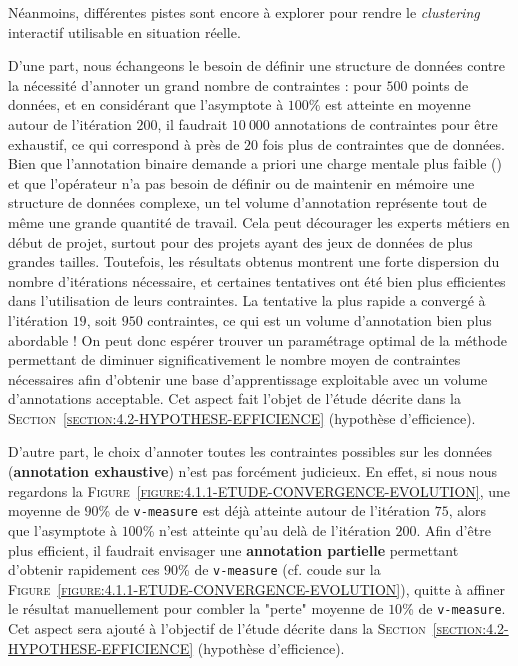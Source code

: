 			
			Néanmoins, différentes pistes sont encore à explorer pour rendre le \textit{clustering} interactif utilisable en situation réelle.
			
			D'une part, nous échangeons le besoin de définir une structure de données contre la nécessité d'annoter un grand nombre de contraintes : pour $500$ points de données, et en considérant que l'asymptote à $100$\% est atteinte en moyenne autour de l'itération $200$, il faudrait $10~000$ annotations de contraintes pour être exhaustif, ce qui correspond à près de $20$ fois plus de contraintes que de données.
			Bien que l'annotation binaire demande a priori une charge mentale plus faible (\cite{hart-staveland:1988:development-nasatlx-task}) et que l'opérateur n'a pas besoin de définir ou de maintenir en mémoire une structure de données complexe, un tel volume d'annotation représente tout de même une grande quantité de travail.
			Cela peut décourager les experts métiers en début de projet, surtout pour des projets ayant des jeux de données de plus grandes tailles.
			Toutefois, les résultats obtenus montrent une forte dispersion du nombre d'itérations nécessaire, et certaines tentatives ont été bien plus efficientes dans l'utilisation de leurs contraintes. La tentative la plus rapide a convergé à l'itération $19$, soit $950$ contraintes, ce qui est un volume d'annotation bien plus abordable !
			On peut donc espérer trouver un paramétrage optimal de la méthode permettant de diminuer significativement le nombre moyen de contraintes nécessaires afin d'obtenir une base d'apprentissage exploitable avec un volume d'annotations acceptable.
			Cet aspect fait l'objet de l'étude décrite dans la \textsc{Section~\ref{section:4.2-HYPOTHESE-EFFICIENCE}} (hypothèse d'efficience).
			
			D'autre part, le choix d'annoter toutes les contraintes possibles sur les données (\textbf{annotation exhaustive}) n'est pas forcément judicieux.
			En effet, si nous nous regardons la \textsc{Figure~\ref{figure:4.1.1-ETUDE-CONVERGENCE-EVOLUTION}}, une moyenne de $90$\% de \texttt{v-measure} est déjà atteinte autour de l'itération $75$, alors que l'asymptote à $100$\% n'est atteinte qu'au delà de l'itération $200$.
			Afin d'être plus efficient, il faudrait envisager une \textbf{annotation partielle} permettant d'obtenir rapidement ces $90$\% de \texttt{v-measure} (cf. coude sur la \textsc{Figure~\ref{figure:4.1.1-ETUDE-CONVERGENCE-EVOLUTION}}), quitte à affiner le résultat manuellement pour combler la "perte" moyenne de $10$\% de \texttt{v-measure}.
			Cet aspect sera ajouté à l'objectif de l'étude décrite dans la \textsc{Section~\ref{section:4.2-HYPOTHESE-EFFICIENCE}} (hypothèse d'efficience).
			
